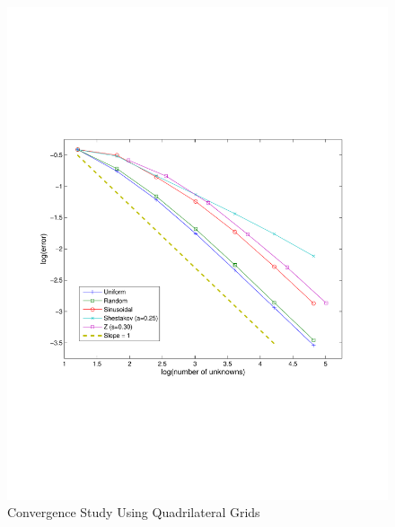 \documentclass[preprint,10pt]{elsarticle}
\begin{document}
\begin{figure}[!hbtp]
\centering
\includegraphics[scale=0.5]{../pwld_diffusion/results/convergence/cv_quad}
\caption{Convergence Study Using Quadrilateral Grids}
\label{fig:conv_rate_quad}
\end{figure}
\end{document}
